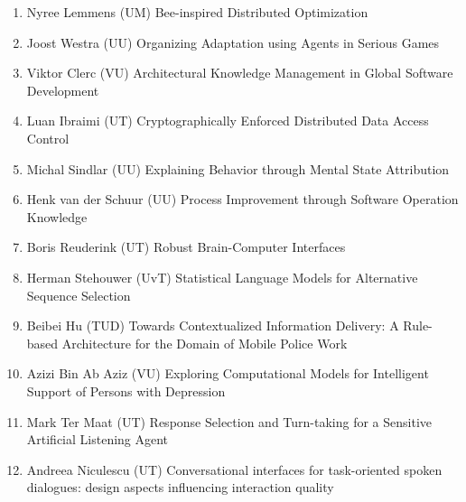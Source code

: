 \begin{multicols}{2}
\begin{scriptsize}
\begin{enumerate}[leftmargin=*,noitemsep,topsep=0pt,parsep=1pt,partopsep=0pt]
\item Nyree Lemmens (UM) Bee-inspired Distributed Optimization
\item Joost Westra (UU) Organizing Adaptation using Agents in Serious Games 
\item Viktor Clerc (VU) Architectural Knowledge Management in Global Software Development 
\item Luan Ibraimi (UT) Cryptographically Enforced Distributed Data Access Control 
\item Michal Sindlar (UU) Explaining Behavior through Mental State Attribution 
\item Henk van der Schuur (UU) Process Improvement through Software Operation Knowledge 
\item Boris Reuderink (UT) Robust Brain-Computer Interfaces 
\item Herman Stehouwer (UvT) Statistical Language Models for Alternative Sequence Selection 
\item Beibei Hu (TUD) Towards Contextualized Information Delivery: A Rule-based Architecture for the Domain of Mobile Police Work 
\item Azizi Bin Ab Aziz (VU) Exploring Computational Models for Intelligent Support of Persons with Depression 
\item Mark Ter Maat (UT) Response Selection and Turn-taking for a Sensitive Artificial Listening Agent 
\item Andreea Niculescu (UT) Conversational interfaces for task-oriented spoken dialogues: design aspects influencing interaction quality
\end{enumerate}


\end{scriptsize}
\end{multicols}
